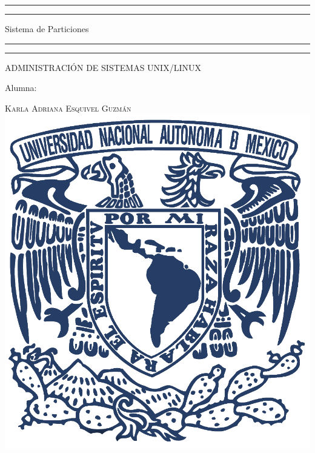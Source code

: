 \documentclass[a4paper, 11pt, oneside]{article}
\begin{document}
 

\begin{titlepage} 

	\centering 
	
	\scshape 
	
	\vspace*{\baselineskip} 
	
	
	
	\rule{\textwidth}{1.6pt}\vspace*{-\baselineskip}\vspace*{2pt} 
	\rule{\textwidth}{0.4pt} 
	
	\vspace{0.75\baselineskip} 
	
	{\LARGE Sistema de Particiones}	
	\vspace{0.75\baselineskip} 
	
	\rule{\textwidth}{0.4pt}\vspace*{-\baselineskip}\vspace{3.2pt}
	\rule{\textwidth}{1.6pt} 
	
	\vspace{2\baselineskip} 
	

	ADMINISTRACIÓN DE SISTEMAS UNIX/LINUX
	
	\vspace*{3\baselineskip} 
	
	
	
	Alumna:
	
	\vspace{0.5\baselineskip} 
	
	{\scshape\Large Karla Adriana Esquivel Guzmán \\} 
	\vspace{0.5\baselineskip} 
	\vfill
	\includegraphics{unam.jpg}
	

\end{titlepage}
\end{document}
